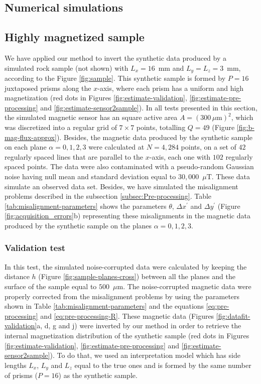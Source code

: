 \documentclass[galley,gc]{agutex}
\begin{document}
\begin{article}
\section{Numerical simulations}
\label{sec:Numerical simulations}

\subsection{Highly magnetized sample}

We have applied our method to invert the synthetic data produced
by a simulated rock sample (not shown) with $L_{x} = 16$~mm and 
$L_{y} = L_{z} = 3$~mm, according to the Figure \ref{fig:sample}.
This synthetic sample is formed by $P = 16$ juxtaposed prisms along 
the $x$-axis, where each prism has a uniform and high magnetization
(red dots in Figures \ref{fig:estimate-validation},
\ref{fig:estimate-pre-processing} and \ref{fig:estimate-sensor2sample}).
In all tests presented in this section, 
the simulated magnetic sensor has an square active area  
$A = (300 \, \mu \text{m})^{2}$, which was discretized into
a regular grid of $7 \times 7$ points, totalling $Q = 49$
(Figure \ref{fig:b-mag-flux-approx}). Besides,
the magnetic data produced by the synthetic sample on 
each plane $\alpha = 0, 1, 2, 3$ were calculated at
$N = 4,284$ points, on a set of $42$ regularly spaced lines 
that are parallel to the $x$-axis, each one with $102$ regularly
spaced points. The data were also contaminated with a 
pseudo-random Gaussian noise having null mean and standard 
deviation equal to $30,000$~$\mu$T. These data simulate
an observed data set.
Besides, we have simulated the misalignment problems 
described in the subsection \ref{subsec:Pre-processing}.
Table \ref{tab:misalignment-parameters} shows the parameters
$\theta$, $\Delta x^{\prime}$ and $\Delta y^{\prime}$ (Figure 
\ref{fig:acquisition_errors}b) representing these misalignments
in the magnetic data produced by the synthetic sample on
the planes $\alpha = 0, 1, 2, 3$.

\subsubsection{Validation test}
\label{subsec:Validation test}

In this test, the simulated noise-corrupted data were calculated 
by keeping the distance $h$ (Figure \ref{fig:sample-planes-cross}) 
between all the planes and the surface of the sample equal to 
$500$~$\mu$m.
The noise-corrupted magnetic data were properly corrected 
from the misalignment problems by using the parameters shown in 
Table \ref{tab:misalignment-parameters} and the equations 
\ref{eq:pre-processing} and \ref{eq:pre-processing-R}.
These magnetic data (Figures \ref{fig:datafit-validation}a, d, g and j)
were inverted by our method in order to retrieve the internal
magnetization distribution of the synthetic sample
(red dots in Figures \ref{fig:estimate-validation},
\ref{fig:estimate-pre-processing} and \ref{fig:estimate-sensor2sample}).
To do that, we used an interpretation model which has side lengths 
$L_{x}$, $L_{y}$ and $L_{z}$ equal to the true ones and is
formed by the same number of prisms ($P = 16$) as the synthetic sample.


\end{article}
\end{document}
